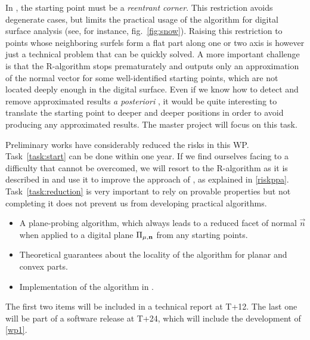 In \cite{LPRJMIV2017}, the starting point must be a \emph{reentrant corner}.
This restriction avoids degenerate cases, but
limits the practical usage of the algorithm for digital surface analysis
(see, for instance, fig.~\ref{fig:snow}). Raising this restriction to points whose neighboring
surfels form a flat part along one or two axis is however just a technical
problem that can be quickly solved. A more important challenge is that the R-algorithm
stops prematurately and outputs only an approximation of the normal vector for some
well-identified starting points, which are not located deeply enough in the digital
surface. Even if we know how to detect and remove approximated results
\emph{a posteriori} \cite{LPRJMIV2017}, it would be quite interesting to translate
the starting point to deeper and deeper positions in order to avoid producing any
approximated results. The master project will focus on this task. %



\Risks
Preliminary works have considerably reduced the risks in this WP. Task~\ref{task:start}
can be done within one year. If we find ourselves facing to a difficulty that cannot be overcomed,
we will resort to the R-algorithm as it is described in \cite{LPRJMIV2017} and use it
to improve the approach of \citeauthor*{Charrier2011} \cite{Charrier2011}, as explained
in \ref{riskppa}. Task~\ref{task:reduction} is very important to rely on provable
properties but not completing it does not prevent us from developing practical algorithms.

\Success
\begin{itemize}
    \item A plane-probing algorithm, which always leads to a
      reduced facet of normal $\vec{n}$ when applied to a digital
      plane $\Pi_{\mu,\mathbf{n}}$ from any starting points.
    \item Theoretical guarantees about the locality of the algorithm
      for planar and convex parts.   
    \item Implementation of the algorithm in \DGtal.   
\end{itemize}
The first two items will be included in a technical report at T+12.
The last one will be part of a software release at T+24, which will include
the development of \ref{wp1}. 

  
